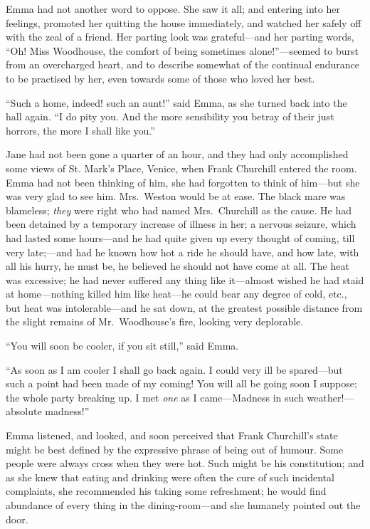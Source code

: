Emma had not another word to oppose.  She saw it all; and entering
into her feelings, promoted her quitting the house immediately,
and watched her safely off with the zeal of a friend.  Her parting
look was grateful---and her parting words, ``Oh!  Miss Woodhouse,
the comfort of being sometimes alone!''---seemed to burst from
an overcharged heart, and to describe somewhat of the continual
endurance to be practised by her, even towards some of those who
loved her best.

``Such a home, indeed! such an aunt!'' said Emma, as she turned back
into the hall again.  ``I do pity you.  And the more sensibility
you betray of their just horrors, the more I shall like you.''

Jane had not been gone a quarter of an hour, and they had only
accomplished some views of St. Mark's Place, Venice, when Frank
Churchill entered the room.  Emma had not been thinking of him,
she had forgotten to think of him---but she was very glad to see him.
Mrs.\ Weston would be at ease.  The black mare was blameless;
\emph{they} were right who had named Mrs.\ Churchill as the cause.
He had been detained by a temporary increase of illness in her;
a nervous seizure, which had lasted some hours---and he had quite given
up every thought of coming, till very late;---and had he known how hot
a ride he should have, and how late, with all his hurry, he must be,
he believed he should not have come at all.  The heat was excessive;
he had never suffered any thing like it---almost wished he had staid
at home---nothing killed him like heat---he could bear any degree of cold,
etc., but heat was intolerable---and he sat down, at the greatest
possible distance from the slight remains of Mr.\ Woodhouse's fire,
looking very deplorable.

``You will soon be cooler, if you sit still,'' said Emma.

``As soon as I am cooler I shall go back again.  I could very
ill be spared---but such a point had been made of my coming!
You will all be going soon I suppose; the whole party breaking up.
I met \emph{one} as I came---Madness in such weather!---absolute madness!''

Emma listened, and looked, and soon perceived that Frank Churchill's
state might be best defined by the expressive phrase of being
out of humour.  Some people were always cross when they were hot.
Such might be his constitution; and as she knew that eating
and drinking were often the cure of such incidental complaints,
she recommended his taking some refreshment; he would find abundance
of every thing in the dining-room---and she humanely pointed out
the door.

